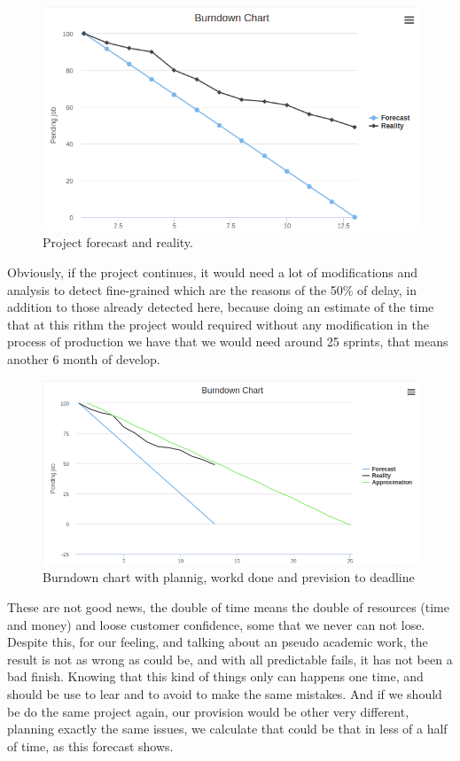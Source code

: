 \begin{figure}[H]
  \includegraphics[scale=0.45]{img/graphics/burndown2.png}
  \centering
  \caption{Project forecast and reality.}
\end{figure}

\noindent Obviously, if the project continues, it would need a lot of
modifications and analysis to detect fine-grained which are the reasons
of the 50\% of delay, in addition to those already detected here,
because doing an estimate of the time that at this rithm the project would required
without any modification in the process of production we have that we would need
around 25 sprints, that means another 6 month of develop.

\begin{figure}[H]
  \includegraphics[scale=0.45]{img/graphics/burndown3.png}
  \centering
  \caption{Burndown chart with plannig, workd done and prevision to deadline}
\end{figure}

\noindent These are not good news, the double of time means the double of resources (time and
money) and loose customer confidence, some that we never can not lose.
Despite this, for our feeling, and talking about an pseudo academic work,
the result is not as wrong as could be, and with all predictable fails,
it has not been a bad finish. Knowing that this kind of things only can happens
one time, and should be use to lear and to avoid to make the same mistakes.
\intro
And if we should be do the same project again, our provision would be other
very different, planning exactly the same issues, we calculate that could be
that in less of a half of time, as this forecast shows.

